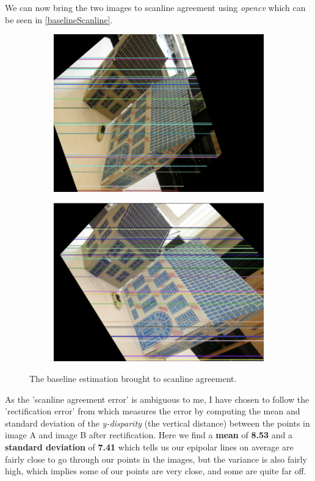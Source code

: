 We can now bring the two images to scanline agreement using \textit{opencv} which can be seen in \autoref{baselineScanline}.
\begin{figure}[h]
	\centering
	\begin{subfigure}{0.48\linewidth}
		\centering
		\includegraphics[width=\linewidth]{Materials/BaselineScanlineA}
	\end{subfigure}
	\begin{subfigure}{0.48\linewidth}
		\centering
		\includegraphics[width=\linewidth]{Materials/BaselineScanlineB}
	\end{subfigure}
	\caption{The baseline estimation brought to scanline agreement.}
	\label{baselineScanline}
\end{figure}
As the 'scanline agreement error' is ambiguous to me, I have chosen to follow the 'rectification error' from \cite{rectificationError} which measures the error by computing the mean and standard deviation of the \textit{y-disparity} (the vertical distance) between the points in image A and image B after rectification. Here we find a \textbf{mean} of \textbf{8.53} and a \textbf{standard deviation} of \textbf{7.41} which tells us our epipolar lines on average are fairly close to go through our points in the images, but the variance is also fairly high, which implies some of our points are very close, and some are quite far off.